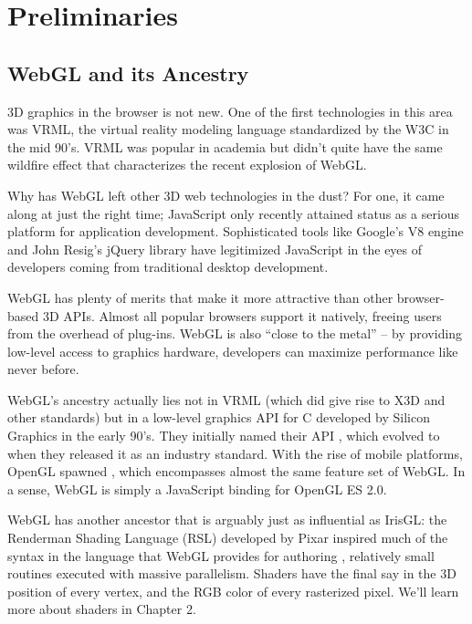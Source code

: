 \chapter{Preliminaries}%
\label{ch1}

\section{WebGL and its Ancestry}

3D graphics in the browser is not new.  One of the first technologies in this area was  VRML, the virtual reality modeling language standardized by the W3C in the mid 90's.  VRML was popular in academia but didn't quite have the same wildfire effect that characterizes the recent explosion of WebGL.

Why has WebGL left other 3D web technologies in the dust?  For one, it came along at just the right time; JavaScript only recently attained status as a serious platform for application development.  Sophisticated tools like Google's V8  engine  and John Resig's jQuery  library have legitimized JavaScript in the eyes of developers coming from traditional desktop development.

WebGL has plenty of merits that make it more attractive than other browser-based 3D APIs.  Almost all popular browsers support it natively, freeing users from the overhead of plug-ins.  WebGL is also ``close to the metal'' -- by providing low-level access to graphics hardware, developers can maximize performance like never before.

WebGL's ancestry actually lies not in VRML (which did give rise to X3D and other standards) but in a low-level graphics API for C developed by Silicon Graphics in the early 90's.  They initially named their API , which evolved to  when they released it as an industry standard.   With the rise of mobile platforms, OpenGL spawned , which encompasses almost the same feature set of WebGL.  In a sense, WebGL is simply a JavaScript binding for OpenGL ES 2.0.

WebGL has another ancestor that is arguably just as influential as IrisGL: the Renderman Shading Language (RSL) developed by Pixar inspired much of the syntax in the language that WebGL provides for authoring  , relatively small routines executed with massive parallelism.  Shaders have the final say in the 3D position of every vertex, and the RGB color of every rasterized pixel.  We'll learn more about shaders in Chapter 2.

